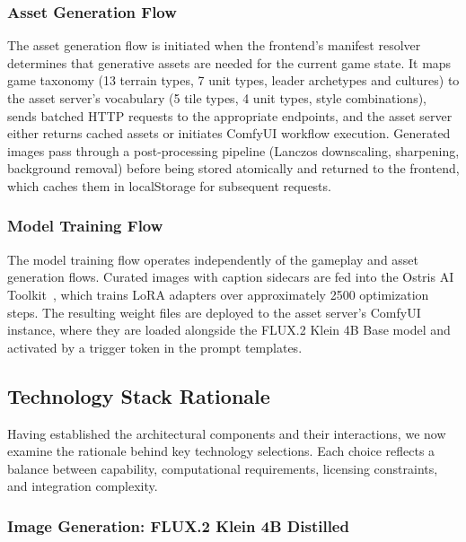 \documentclass[conference]{IEEEtran}
\begin{document}
\subsubsection{Asset Generation Flow}

The asset generation flow is initiated when the frontend's manifest resolver determines that generative assets are needed for the current game state. It maps game taxonomy (13 terrain types, 7 unit types, leader archetypes and cultures) to the asset server's vocabulary (5 tile types, 4 unit types, style combinations), sends batched HTTP requests to the appropriate endpoints, and the asset server either returns cached assets or initiates ComfyUI workflow execution. Generated images pass through a post-processing pipeline (Lanczos downscaling, sharpening, background removal) before being stored atomically and returned to the frontend, which caches them in localStorage for subsequent requests.

\subsubsection{Model Training Flow}

The model training flow operates independently of the gameplay and asset generation flows. Curated images with caption sidecars are fed into the Ostris AI Toolkit~\cite{ostris2024toolkit}, which trains LoRA adapters over approximately 2500 optimization steps. The resulting weight files are deployed to the asset server's ComfyUI instance, where they are loaded alongside the FLUX.2 Klein 4B Base model and activated by a trigger token in the prompt templates.

\subsection{Technology Stack Rationale}

Having established the architectural components and their interactions, we now examine the rationale behind key technology selections. Each choice reflects a balance between capability, computational requirements, licensing constraints, and integration complexity.

\subsubsection{Image Generation: FLUX.2 Klein 4B Distilled}
\end{document}
